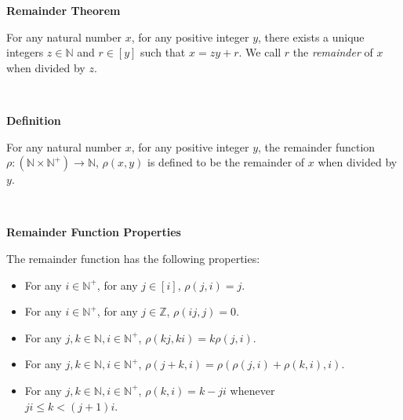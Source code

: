 \documentclass[a4paper,12pt]{article}
\begin{document}
\label{theorem:remainder_theorem}
\hypertarget{theorem:remainder_theorem}{}
\begin{tcolorbox}
\textbf{Remainder Theorem}

\noindent For any natural number $x$, for any positive integer $y$, there exists a unique integers $z \in \mathbb{N}$ and $r \in [y]$ such that $x = zy + r$. We call $r$ the \textit{remainder} of $x$ when divided by $z$.
\end{tcolorbox}
\noindent \\








\label{definition:remainder_function}
\hypertarget{definition:remainder_function}{}
\begin{tcolorbox}
\textbf{Definition}

\noindent For any natural number $x$, for any positive integer $y$,  the remainder function $\rho : (\mathbb{N} \times \mathbb{N}^+) \rightarrow \mathbb{N}$, $\rho(x, y)$ is defined to be the remainder of $x$ when divided by $y$.
\end{tcolorbox}
\noindent \\





\label{remainder_properties}
\hypertarget{remainder_properties}{}
\begin{tcolorbox}
\textbf{Remainder Function Properties}

\noindent The remainder function has the following properties:

\begin{itemize}

\item For any $i \in \mathbb{N}^+$, for any $j \in [i]$, $\rho(j, i) = j$.

\item For any $i \in \mathbb{N}^+$, for any $j \in \mathbb{Z}$, $\rho(ij, j) = 0$.

\item For any $j, k \in \mathbb{N}, i \in \mathbb{N}^+$, $\rho(kj, ki) = k \rho(j, i)$.

\item For any $j, k \in \mathbb{N}, i \in \mathbb{N}^+$, $\rho(j + k, i) = \rho(\rho(j, i) + \rho(k, i), i)$. 

\item For any $j, k \in \mathbb{N}, i \in \mathbb{N}^+$, $\rho(k, i) = k - ji$ whenever \\$ji \leq k < (j + 1)i$. 

\end{itemize}
\end{tcolorbox}
\noindent \\
\end{document}
